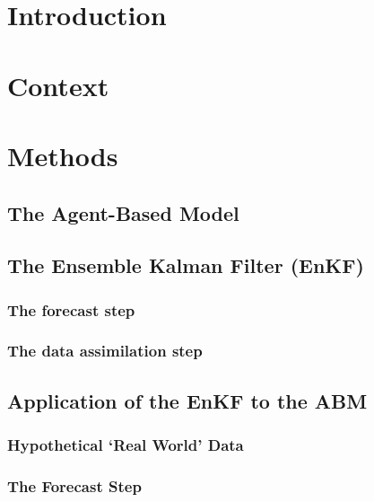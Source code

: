 \section{Introduction}
\label{malleson:intro}

\section{Context}
\label{malleson:context}

\section{Methods}
\label{malleson:methods}

\subsection{The Agent-Based Model}
\label{malleson:methods:abm}

\subsection{The Ensemble Kalman Filter (EnKF)}
\label{malleson:methods:enkf}

\subsubsection{The forecast step}
\label{methods:enkf:forecast}

\subsubsection{The data assimilation step}
\label{methods:enkf:assimilation}

\subsection{Application of the EnKF to the ABM}
\label{malleson:methods:application}

\subsubsection{Hypothetical `Real World' Data}
\label{methods:application:data}

\subsubsection{The Forecast Step}
\label{methods:application:forecast}

